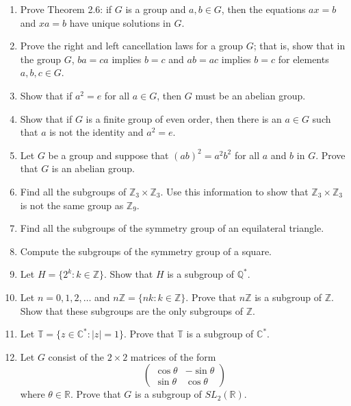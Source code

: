 {\begin{enumerate}
 
\item
Prove Theorem 2.6: if $G$ is a group and $a, b \in G$, then
the equations $ax = b$ and $xa = b$ have unique solutions in $G$. 
 
 
\item
Prove the right and left cancellation laws for a group $G$; that is,
show that in the group $G$, $ba = ca$ implies $b = c$ and $ab = ac$
implies $b = c$ for elements $a, b, c \in G$.  
 
\item
Show that if $a^2 = e$ for all $a \in G$, then $G$ must be an abelian
group. 
 
 
\item
Show that if $G$ is a finite group of even order, then there is an $a
\in G$ such that $a$ is not the identity and $a^2 = e$.
 
 
\item
Let $G$ be a group and suppose that $(ab)^2 = a^2b^2$ for all $a$ and
$b$ in $G$.  Prove that $G$ is an abelian group. 
 
 
\item
Find all the subgroups of ${\mathbb Z}_3 \times {\mathbb Z}_3$. Use this
information to show that ${\mathbb Z}_3 \times {\mathbb Z}_3$ is not the
same group as ${\mathbb Z}_9$.
 
 
\item
Find all the subgroups of the symmetry group of an equilateral
triangle. 
 
 
\item
Compute the subgroups of the symmetry group of a square.
 
 
\item
Let $H = \{2^k : k \in {\mathbb Z} \}$. Show that $H$ is a subgroup of
${\mathbb Q}^*$. 
 
 
\item
Let $n = 0, 1, 2, \ldots$ and $n {\mathbb Z} = \{ nk : k \in  {\mathbb Z}
\}$. Prove that $n {\mathbb Z}$ is a subgroup of ${\mathbb Z}$.  Show that
these subgroups are the only subgroups of $\mathbb{Z}$.
 
 
\item
Let ${\mathbb T} = \{ z \in  {\mathbb C}^* : |z| =1 \}$. Prove that ${\mathbb
T}$ is a subgroup of ${\mathbb C}^*$. 
 
 
\item
Let $G$ consist of the $2 \times 2$ matrices of the form
$$
\left(
\begin{array}{cc}
\cos \theta & -\sin \theta \\
\sin \theta & \cos \theta
\end{array}
\right)
$$
where $\theta \in {\mathbb R}$. Prove that $G$ is a subgroup of $SL_2(
{\mathbb R})$. 
 

\end{enumerate}}
